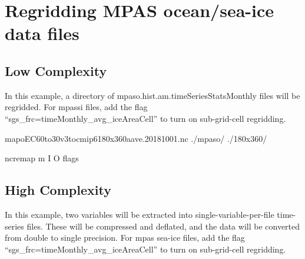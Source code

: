 \documentclass[letterpaper,10pt,english]{sphinxmanual}
\begin{document}
\section{Regridding MPAS ocean/sea-ice data files}
\label{\detokenize{mpas_regrid:regridding-mpas-ocean-sea-ice-data-files}}

\subsection{Low Complexity}
\label{\detokenize{mpas_regrid:low-complexity}}
In this example, a directory of mpaso.hist.am.timeSeriesStatsMonthly files will be regridded.
For mpassi files, add the flag “\textendash{}sgs\_frc=timeMonthly\_avg\_iceAreaCell” to turn on sub-grid-cell regridding.

\begin{sphinxVerbatim}[commandchars=\\\{\}]
map\PYGZus{}oEC60to30v3\PYGZus{}to\PYGZus{}cmip6\PYGZus{}180x360\PYGZus{}aave.20181001.nc 
./mpaso/
./180x360/
  

ncremap \PYGZhy{}m  \PYGZhy{}I  \PYGZhy{}O  flags
\end{sphinxVerbatim}


\subsection{High Complexity}
\label{\detokenize{mpas_regrid:high-complexity}}
In this example, two variables will be extracted into single-variable-per-file time-series files.
These will be compressed and deflated, and the data will be converted from double to single precision.
For mpas sea-ice files, add the flag “\textendash{}sgs\_frc=timeMonthly\_avg\_iceAreaCell” to turn on sub-grid-cell regridding.
\end{document}
